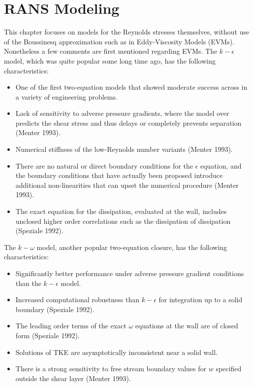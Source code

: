 \documentclass[oneside,a4paper,11pt]{report}
\begin{document}
\chapter{RANS Modeling}
%
This chapter focuses on models for the Reynolds stresses themselves, without use of the Boussinesq approximation such as in Eddy-Viscosity Models (EVMs). Nonetheless a few comments are first mentioned regarding EVMs. The $k-\epsilon$ model, which was quite popular some long time ago, has the following characteristics:
\begin{itemize}
\item One of the first two-equation models that showed moderate success across in a variety of engineering problems.
\item Lack of sensitivity to adverse pressure gradients, where the model over predicts the shear stress and thus delays or completely prevents separation (Menter 1993).
\item Numerical stiffness of the low-Reynolds number variants (Menter 1993).
\item There are no natural or direct boundary conditions for the $\epsilon$ equation, and the boundary conditions that have actually been proposed introduce additional non-linearities that can upset the numerical procedure (Menter 1993). 
\item The exact equation for the dissipation, evaluated at the wall, includes unclosed higher order correlations such as the dissipation of dissipation (Speziale 1992).  
\end{itemize}
The $k-\omega$ model, another popular two-equation closure, has the following characteristics:
\begin{itemize}
\item Significantly better performance under adverse pressure gradient conditions than the $k-\epsilon$ model.
\item Increased computational robustness than $k-\epsilon$ for integration up to a solid boundary (Speziale 1992).
\item The leading order terms of the exact $\omega$ equations at the wall are of closed form (Speziale 1992). 
\item  Solutions of TKE are asymptotically inconsistent near a solid wall.
\item There is a strong sensitivity to free stream boundary values for $w$ specified outside the shear layer (Menter 1993).
\end{itemize}
\end{document}

